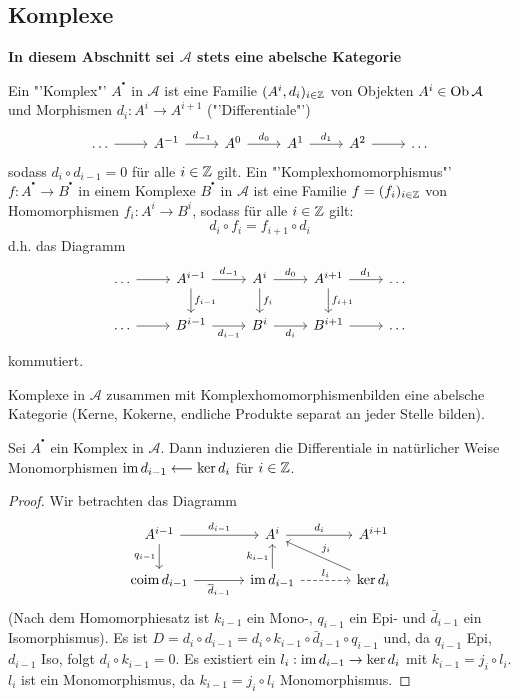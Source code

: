 \subsection{Komplexe}
\begin{center}
	\textbf{In diesem Abschnitt sei $\mathcal{A}$ stets eine abelsche Kategorie}
\end{center}
\begin{df}
	Ein "'Komplex"' $A^{^\bullet}$ in $\mathcal{A}$ ist eine Familie $(A^i, d_i)_{i\in \mathbb{Z}}$ von Objekten $A^i \in \text{Ob}\,\mathcal{A}$ und Morphismen $d_i: A^i \to A^{i+1}$ ("'Differentiale"')
	$$\begin{tikzcd}
	\ldots \arrow{r} & A^{-1} \arrow{r}{d_{-1}}& A^0 \arrow{r}{d_0} & A^1 \arrow{r}{d_1} & A^2 \arrow{r} & \ldots
	\end{tikzcd}$$
	sodass $d_i \circ d_{i-1} =0$ für alle $i\in \mathbb{Z}$ gilt. Ein "'Komplexhomomorphismus"' $f:A^{^\bullet} \to B^{^\bullet}$ in einem Komplexe $B^{^\bullet}$ in $\mathcal{A}$ ist eine Familie $f=(f_i)_{i\in \mathbb{Z}}$ von Homomorphismen $f_i : A^i \to B^i$, sodass für alle $i\in \mathbb{Z}$ gilt:
	$$d_i \circ f_i = f_{i+1} \circ d_i$$
	d.h. das Diagramm 
	$$\begin{tikzcd}
	\ldots \arrow{r} & A^{i-1}\arrow{d}{f_{i-1}} \arrow{r}{d_{-1}}& A^i \arrow{d}{f_i}\arrow{r}{d_0} & A^{i+1} \arrow{d}{f_{i+1}} \arrow{r}{d_1} & \ldots\\
	\ldots \arrow{r} & B^{i-1} \arrow[swap]{r}{d_{i-1}} & B^i \arrow[swap]{r}{d_i} & B^{i+1} \arrow{r} & \ldots
	\end{tikzcd}$$
	kommutiert.
\end{df}
\begin{anm}
	Komplexe in $\mathcal{A}$ zusammen mit Komplexhomomorphismenbilden eine abelsche Kategorie (Kerne, Kokerne, endliche Produkte separat an jeder Stelle bilden).
\end{anm}
\begin{bem}
	Sei $A^{^\bullet}$ ein Komplex in $\mathcal{A}$. Dann induzieren die Differentiale in natürlicher Weise Monomorphismen $\operatorname{im} d_{i-1} \longleftarrow \ker d_i$ für $i\in \mathbb{Z}$.
\end{bem}
\begin{proof}
	Wir betrachten das Diagramm
	$$\begin{tikzcd}[column sep = large]
	A^{i-1} \arrow[swap]{d}{q_{i-1}} \arrow{r}{d_{i-1}} & A^i \arrow{r}{d_i} & A^{i+1} \\
	\text{coim} \, d_{i-1} \arrow[swap]{r}{\bar{d}_{i-1}} & \im d_{i-1} \arrow{u}{k_{i-1}}\arrow[dashed]{r}{l_i} & \ker d_i \arrow[swap]{ul}{j_i}
	\end{tikzcd}$$
	(Nach dem Homomorphiesatz ist $k_{i-1}$ ein Mono-, $q_{i-1}$ ein Epi- und $\bar{d}_{i-1}$ ein Isomorphismus). Es ist $D= d_i \circ d_{i-1} = d_i \circ k_{i-1} \circ \bar{d}_{i-1} \circ q_{i-1}$ und, da $q_{i-1}$ Epi, $d_{i-1}$ Iso, folgt $d_i \circ k_{i-1} =0$. Es existiert ein $l_i : \operatorname{im} d_{i-1} \to \ker d_i$ mit $k_{i-1} = j_i \circ l_i$. $l_i$ ist ein Monomorphismus, da $k_{i-1} = j_i \circ l_i$ Monomorphismus.
\end{proof}
